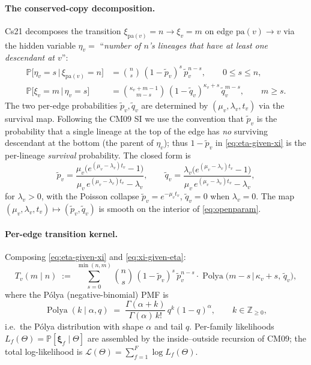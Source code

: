 \documentclass[11pt]{article}
\newcommand{\Z}{\mathbb{Z}}
\newcommand{\PROB}{\mathbb{P}}
\newcommand{\pa}{\mathrm{pa}}
\newcommand{\Prof}{\boldsymbol{\xi}}
\newcommand{\rate}{\kappa}             %
\newcommand{\dup}{\lambda}             %
\newcommand{\loss}{\mu}                %
\newcommand{\edgelen}{t}               %
\newcommand{\survp}{\tilde p}          %
\newcommand{\survq}{\tilde q}          %
\newcommand{\Ll}{\mathcal{L}}
\DeclareMathOperator{\Pol}{Polya}
\theoremstyle{definition}
\begin{document}
\paragraph{The conserved-copy decomposition.}
Cs21 decomposes the transition $\xi_{\pa(v)} = n \to \xi_v = m$ on
edge $\pa(v)\to v$ via the hidden variable
$\eta_v = $ ``\emph{number of $n$'s lineages that have at least one
descendant at $v$}'':
\begin{align}
\PROB\bigl[\eta_v = s \,\bigl|\, \xi_{\pa(v)} = n\bigr]
&= \binom{n}{s}\,(1-\survp_v)^s\,\survp_v^{n-s},
\qquad 0 \le s \le n,
\label{eq:eta-given-xi}\\
\PROB\bigl[\xi_v = m \,\bigl|\, \eta_v = s\bigr]
&= \binom{\rate_v + m - 1}{m - s}\,
   (1-\survq_v)^{\rate_v + s}\,\survq_v^{m - s},
\qquad m \ge s.
\label{eq:xi-given-eta}
\end{align}
The two per-edge probabilities $\survp_v, \survq_v$ are determined by
$(\loss_v, \dup_v, \edgelen_v)$ via the survival map.  Following the
CM09 SI we use the convention that $\survp_v$ is the probability that
a single lineage at the top of the edge has \emph{no} surviving
descendant at the bottom (the parent of $\eta_v$); thus
$1-\survp_v$ in \eqref{eq:eta-given-xi} is the per-lineage
\emph{survival} probability. The closed form is
\begin{equation}
\survp_v
=
\frac{\loss_v\bigl(e^{(\loss_v - \dup_v)\edgelen_v} - 1\bigr)}
     {\loss_v\,e^{(\loss_v - \dup_v)\edgelen_v} - \dup_v},
\qquad
\survq_v
=
\frac{\dup_v\bigl(e^{(\loss_v - \dup_v)\edgelen_v} - 1\bigr)}
     {\loss_v\,e^{(\loss_v - \dup_v)\edgelen_v} - \dup_v},
\label{eq:surv-explicit}
\end{equation}
for $\dup_v > 0$, with the Poisson collapse $\survp_v = e^{-\loss_v\edgelen_v}$,
$\survq_v = 0$ when $\dup_v = 0$. The map
$(\loss_v, \dup_v, \edgelen_v) \mapsto (\survp_v, \survq_v)$ is
smooth on the interior of \eqref{eq:openparam}.

\paragraph{Per-edge transition kernel.}
Composing \eqref{eq:eta-given-xi} and \eqref{eq:xi-given-eta}:
\begin{equation}
T_v(m \mid n)
\;:=\;
\sum_{s=0}^{\min(n,m)}
   \binom{n}{s}\,(1-\survp_v)^s\,\survp_v^{n-s}
   \cdot \Pol\bigl(m - s \,\big|\, \rate_v + s,\, \survq_v\bigr),
\label{eq:transition}
\end{equation}
where the Pólya (negative-binomial) PMF is
\begin{equation}
\Pol(k \mid \alpha, q)
\;=\;
\frac{\Gamma(\alpha + k)}{\Gamma(\alpha)\, k!}\,
q^k (1 - q)^\alpha,
\qquad k \in \Z_{\ge 0},
\label{eq:polya-pmf}
\end{equation}
i.e.\ the Pólya distribution with shape $\alpha$ and tail $q$.
Per-family likelihoods $L_f(\Theta) = \PROB[\Prof_f \mid \Theta]$
are assembled by the inside--outside recursion of CM09; the total
log-likelihood is $\Ll(\Theta) = \sum_{f=1}^F \log L_f(\Theta)$.
\end{document}
